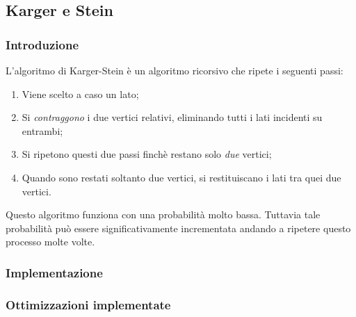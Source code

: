 \subsection{Karger e Stein}

\subsubsection{Introduzione}
L'algoritmo di Karger-Stein è un algoritmo ricorsivo che ripete i 
seguenti passi:
\begin{enumerate}
    \item Viene scelto a caso un lato;
    \item Si \textit{contraggono} i due vertici relativi, eliminando tutti i lati incidenti su entrambi;
    \item Si ripetono questi due passi finchè restano solo \textit{due} vertici;
    \item Quando sono restati soltanto due vertici, si restituiscano i lati tra quei due vertici.
\end{enumerate}

Questo algoritmo funziona con una probabilità molto bassa. Tuttavia tale probabilità 
può essere significativamente incrementata andando a ripetere questo processo molte 
volte.

\subsubsection{Implementazione}

\subsubsection{Ottimizzazioni implementate}

